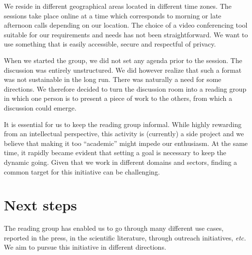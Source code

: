 \documentclass[journal]{IEEEtran}
\begin{document}
We reside  in different geographical  areas located in  different time
zones. The sessions take place online at a time which corresponds to morning or
late afternoon calls depending on our  location. The choice of a video
conferencing tool suitable for our requirements and needs  has not been
straightforward.   We want to use something that is easily  accessible, secure  and
respectful of privacy.

When we  started the  group, we did  not set any  agenda prior  to the
session.  The discussion  was  entirely unstructured.  We did  however
realize that such a format was  not sustainable in the long run. There
was naturally a need for some directions. We therefore decided to turn
the discussion room into a reading  group in which one person is to
present a  piece of  work to the  others, from  which a
discussion could emerge.

It  is essential  for us  to keep  the reading  group informal.  While
highly rewarding  from an  intellectual perspective, this  activity is
(currently)  a  side  project  and  we  believe  that  making  it  too
“academic” might impede  our enthusiasm. At the same  time, it rapidly
became evident  that setting a goal is  necessary to keep  the dynamic
going. Given that we work in  different domains and sectors, finding a
common target for this initiative can be challenging.

\section{Next steps}

The reading  group has  enabled us  to go  through many  different use
cases, reported  in the press,  in the scientific  literature, through
outreach  initiatives,  \textit{etc.}  We  aim to  pursue  this  initiative  in
different directions.
\end{document}
